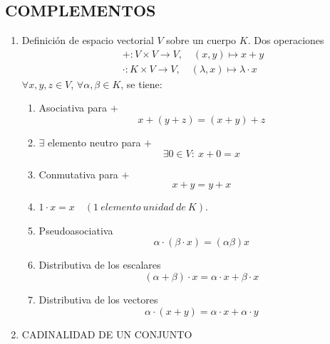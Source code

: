 \documentclass{article}
\begin{document}
\subsection{COMPLEMENTOS}
\begin{enumerate}
\item Definición de espacio vectorial $V$ sobre un cuerpo $K$. Dos operaciones
\begin{gather*}
+:V\times V\rightarrow V,\quad (x,y)\mapsto x+y\\
\cdot:K\times V\rightarrow V,\quad (\lambda,x)\mapsto \lambda\cdot x
\end{gather*}
$\forall x,y,z\in V$, $\forall\alpha,\beta\in K$, se tiene:
	\begin{enumerate}
	\item Asociativa para $+$
	\begin{equation*}
	x+(y+z)=(x+y)+z
	\end{equation*}
	
	\item $\exists$ elemento neutro para $+$
	\begin{equation*}
	\exists 0\in V:\:x+0=x
	\end{equation*}
	
	\item Conmutativa para $+$
	\begin{equation*}
	x+y=y+x
	\end{equation*}
	
	\item $1\cdot x=x\quad (1\:elemento\:unidad\:de\:K)$.
	
	\item Pseudoasociativa
	\begin{equation*}
	\alpha\cdot(\beta\cdot x)=(\alpha\beta)x
	\end{equation*}
	
	\item Distributiva de los escalares
	\begin{equation*}
	(\alpha+\beta)\cdot x=\alpha\cdot x+\beta \cdot x
	\end{equation*}
	
	\item Distributiva de los vectores
	\begin{equation*}
	\alpha\cdot (x+y)=\alpha\cdot x + \alpha \cdot y
	\end{equation*}
	\end{enumerate}

\item CADINALIDAD DE UN CONJUNTO\\


\end{enumerate}
\end{document}

